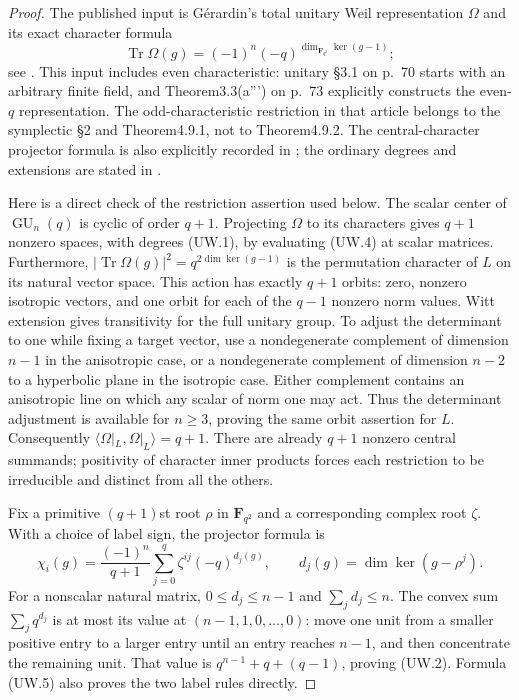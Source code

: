 \begin{proof}
The published input is G\'erardin's total unitary Weil representation
$\Omega$ and its exact character formula
\[
 \operatorname{Tr}\Omega(g)
       =(-1)^n(-q)^{\dim_{\mathbf F_{q^2}}\ker(g-1)};
                                                               \tag{UW.4}
\]
see \cite[Theorem4.9.2 and its complete proof, pp.~99--100]{BI:GerardinLinear}.
This input includes even characteristic: unitary \S3.1 on p.~70
starts with an arbitrary finite field, and Theorem3.3(a\textnormal{'''})
on p.~73 explicitly constructs the even-$q$ representation.
The odd-characteristic restriction in that article belongs to the
symplectic \S2 and Theorem4.9.1, not to Theorem4.9.2.
The central-character projector formula is also explicitly recorded
in \cite[\S4.3, (4.3)--(4.4), author-version p.~16]{BI:GLOST2018};
the ordinary degrees and extensions are stated in
\cite[p.~293]{BI:GMST2002}.

Here is a direct check of the restriction assertion used below.
The scalar center of $\operatorname{GU}_n(q)$ is cyclic of order
$q+1$. Projecting $\Omega$ to its characters gives $q+1$ nonzero
spaces, with degrees (UW.1), by evaluating (UW.4) at scalar matrices.
Furthermore, $|\operatorname{Tr}\Omega(g)|^2=q^{2\dim\ker(g-1)}$
is the permutation character of $L$ on its natural vector space.
This action has exactly $q+1$ orbits: zero, nonzero isotropic
vectors, and one orbit for each of the $q-1$ nonzero norm values.
Witt extension gives transitivity for the full unitary group.
To adjust the determinant to one while fixing a target vector,
use a nondegenerate complement of dimension $n-1$ in the
anisotropic case, or a nondegenerate complement of dimension
$n-2$ to a hyperbolic plane in the isotropic case. Either
complement contains an anisotropic line on which any scalar
of norm one may act. Thus the determinant adjustment is available
for $n\ge3$, proving the same orbit assertion for $L$.
Consequently $\langle\Omega|_L,\Omega|_L\rangle=q+1$.
There are already $q+1$ nonzero central summands; positivity of
character inner products forces each restriction to be irreducible
and distinct from all the others.

Fix a primitive $(q+1)$st root $\rho$ in $\mathbf F_{q^2}$ and
a corresponding complex root $\zeta$. With a choice of label sign,
the projector formula is
\[
 \chi_i(g)=\frac{(-1)^n}{q+1}
       \sum_{j=0}^{q}\zeta^{ij}(-q)^{d_j(g)},\qquad
 d_j(g)=\dim\ker(g-\rho^j).                                \tag{UW.5}
\]
For a nonscalar natural matrix, $0\le d_j\le n-1$ and
$\sum_jd_j\le n$. The convex sum $\sum_jq^{d_j}$ is at
most its value at $(n-1,1,0,\ldots,0)$: move one unit from
a smaller positive entry to a larger entry until an entry
reaches $n-1$, and then concentrate the remaining unit.
That value is $q^{n-1}+q+(q-1)$, proving (UW.2).
Formula (UW.5) also proves the two label rules directly.


\end{proof}
